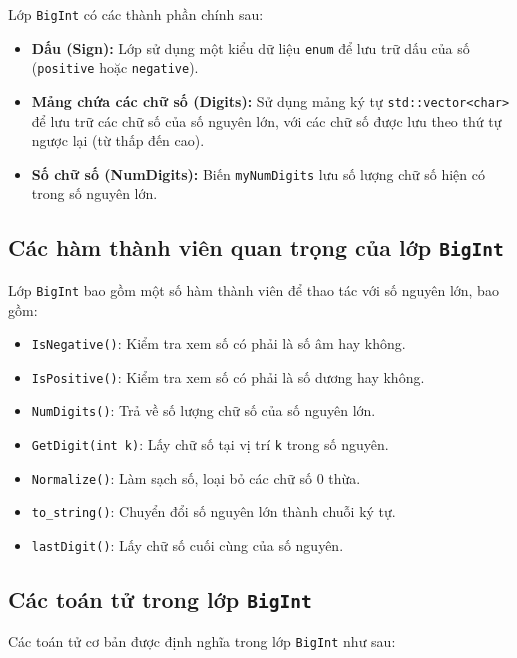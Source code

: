 \documentclass[a4paper,12pt]{article}
\begin{document}
Lớp \texttt{BigInt} có các thành phần chính sau:

\begin{itemize}
    \item \textbf{Dấu (Sign):} Lớp sử dụng một kiểu dữ liệu \texttt{enum} để lưu trữ dấu của số (\texttt{positive} hoặc \texttt{negative}).
    \item \textbf{Mảng chứa các chữ số (Digits):} Sử dụng mảng ký tự \texttt{std::vector<char>} để lưu trữ các chữ số của số nguyên lớn, với các chữ số được lưu theo thứ tự ngược lại (từ thấp đến cao).
    \item \textbf{Số chữ số (NumDigits):} Biến \texttt{myNumDigits} lưu số lượng chữ số hiện có trong số nguyên lớn.
\end{itemize}

\subsection{Các hàm thành viên quan trọng của lớp \texttt{BigInt}}

Lớp \texttt{BigInt} bao gồm một số hàm thành viên để thao tác với số nguyên lớn, bao gồm:

\begin{itemize}
    \item \texttt{IsNegative()}: Kiểm tra xem số có phải là số âm hay không.
    \item \texttt{IsPositive()}: Kiểm tra xem số có phải là số dương hay không.
    \item \texttt{NumDigits()}: Trả về số lượng chữ số của số nguyên lớn.
    \item \texttt{GetDigit(int k)}: Lấy chữ số tại vị trí \texttt{k} trong số nguyên.
    \item \texttt{Normalize()}: Làm sạch số, loại bỏ các chữ số 0 thừa.
    \item \texttt{to\_string()}: Chuyển đổi số nguyên lớn thành chuỗi ký tự.
    \item \texttt{lastDigit()}: Lấy chữ số cuối cùng của số nguyên.
\end{itemize}

\subsection{Các toán tử trong lớp \texttt{BigInt}}

Các toán tử cơ bản được định nghĩa trong lớp \texttt{BigInt} như sau:
\end{document}
